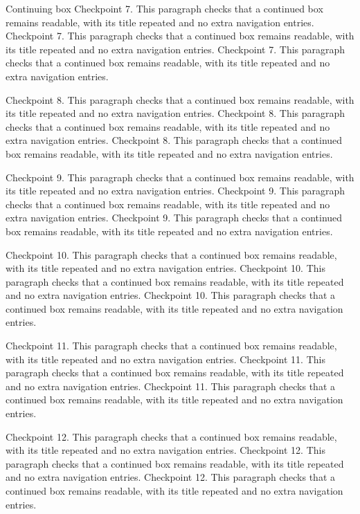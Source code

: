 \documentclass[algorithms,listings]{tempusreport}
\begin{document}
\begin{reportbox}{Continuing box}
Checkpoint 7. This paragraph checks that a continued box remains readable, with its title repeated and no extra navigation entries. Checkpoint 7. This paragraph checks that a continued box remains readable, with its title repeated and no extra navigation entries. Checkpoint 7. This paragraph checks that a continued box remains readable, with its title repeated and no extra navigation entries.

Checkpoint 8. This paragraph checks that a continued box remains readable, with its title repeated and no extra navigation entries. Checkpoint 8. This paragraph checks that a continued box remains readable, with its title repeated and no extra navigation entries. Checkpoint 8. This paragraph checks that a continued box remains readable, with its title repeated and no extra navigation entries.

Checkpoint 9. This paragraph checks that a continued box remains readable, with its title repeated and no extra navigation entries. Checkpoint 9. This paragraph checks that a continued box remains readable, with its title repeated and no extra navigation entries. Checkpoint 9. This paragraph checks that a continued box remains readable, with its title repeated and no extra navigation entries.

Checkpoint 10. This paragraph checks that a continued box remains readable, with its title repeated and no extra navigation entries. Checkpoint 10. This paragraph checks that a continued box remains readable, with its title repeated and no extra navigation entries. Checkpoint 10. This paragraph checks that a continued box remains readable, with its title repeated and no extra navigation entries.

Checkpoint 11. This paragraph checks that a continued box remains readable, with its title repeated and no extra navigation entries. Checkpoint 11. This paragraph checks that a continued box remains readable, with its title repeated and no extra navigation entries. Checkpoint 11. This paragraph checks that a continued box remains readable, with its title repeated and no extra navigation entries.

Checkpoint 12. This paragraph checks that a continued box remains readable, with its title repeated and no extra navigation entries. Checkpoint 12. This paragraph checks that a continued box remains readable, with its title repeated and no extra navigation entries. Checkpoint 12. This paragraph checks that a continued box remains readable, with its title repeated and no extra navigation entries.


\end{reportbox}
\end{document}

